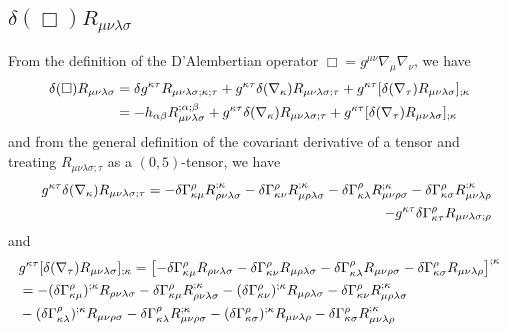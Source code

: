 \subsection{$\delta(\Box)R_{\mu\nu\lambda\sigma}$}
From the definition of the D'Alembertian operator
$\Box=g^{\mu\nu}\nabla_{\mu}\nabla_{\nu}$, we have
\begin{align}\nonumber
\delta(\Box)R_{\mu\nu\lambda\sigma}&=\delta
g^{\kappa\tau}R_{\mu\nu\lambda\sigma;\kappa;\tau}+g^{\kappa\tau}\delta(\nabla_{
\kappa})R_{\mu\nu\lambda\sigma;\tau}+g^{\kappa\tau}[\delta(\nabla_{\tau})R_{
\mu\nu\lambda\sigma}]_{;\kappa}
\\&
=-h_{\alpha\beta}R_{\mu\nu\lambda\sigma}^{;\alpha;\beta}+g^{\kappa\tau}
\delta(\nabla_{\kappa})R_{\mu\nu\lambda\sigma;\tau}+g^{\kappa\tau}[
\delta(\nabla_{\tau})R_{\mu\nu\lambda\sigma}]_{;\kappa}
\end{align}
and from the general definition of the covariant derivative of a tensor and
treating $R_{\mu\nu\lambda\sigma;\tau}$ as a $(0,5)$-tensor, we have
\begin{eqnarray}
&& g^{\kappa\tau}\delta(\nabla_{\kappa})R_{\mu\nu\lambda\sigma;\tau}=-\delta\Gamma_
{\kappa\mu}^{\rho}R_{\rho\nu\lambda\sigma}^{;\kappa}-\delta\Gamma_{\kappa\nu}^{
\rho}R_{\mu\rho\lambda\sigma}^{;\kappa}-\delta\Gamma_{\kappa\lambda}^{\rho}R_{
\mu\nu\rho\sigma}^{;\kappa}-\delta\Gamma_{\kappa\sigma}^{\rho}R_{
\mu\nu\lambda\rho}^{;\kappa}
\nonumber\\&&
-g^{\kappa\tau}\delta\Gamma_{\kappa\tau}^{\rho}R_{
\mu\nu\lambda\sigma;\rho}
\end{eqnarray}
and
\begin{align}\nonumber
&g^{\kappa\tau}[\delta(\nabla_{\tau})R_{\mu\nu\lambda\sigma}]_{;\kappa}=\left[
-\delta\Gamma_{\kappa\mu}^{\rho}R_{\rho\nu\lambda\sigma}-\delta\Gamma_{\kappa\nu
}^{\rho}R_{\mu\rho\lambda\sigma}-\delta\Gamma_{\kappa\lambda}^{\rho}R_{
\mu\nu\rho\sigma}-\delta\Gamma_{\kappa\sigma}^{\rho}R_{\mu\nu\lambda\rho}\right]
^{;\kappa}
\\&=-(\delta\Gamma_{\kappa\mu}^{\rho})^{;\kappa}R_{\rho\nu\lambda\sigma}
-\delta\Gamma_{\kappa\mu}^{\rho}R_{\rho\nu\lambda\sigma}^{;\kappa}
-(\delta\Gamma_{\kappa\nu}^{\rho})^{;\kappa}R_{\mu\rho\lambda\sigma}
-\delta\Gamma_{\kappa\nu}^{\rho}R_{\mu\rho\lambda\sigma}^{;\kappa}
\nonumber\\&
-(\delta\Gamma_{\kappa\lambda}^{\rho})^{;\kappa}R_{\mu\nu\rho\sigma}
-\delta\Gamma_{\kappa\lambda}^{\rho}R_{\mu\nu\rho\sigma}^{;\kappa}
-(\delta\Gamma_{\kappa\sigma}^{\rho})^{;\kappa}R_{\mu\nu\lambda\rho}
-\delta\Gamma_{\kappa\sigma}^{\rho}R_{\mu\nu\lambda\rho}^{;\kappa}
\end{align}
